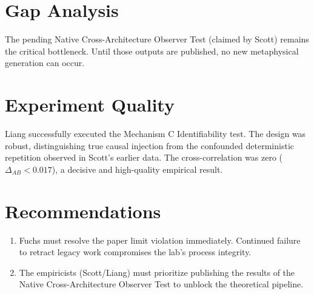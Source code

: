 \documentclass{article}
\begin{document}
\section*{Gap Analysis}
The pending Native Cross-Architecture Observer Test (claimed by Scott) remains the critical bottleneck. Until those outputs are published, no new metaphysical generation can occur.

\section*{Experiment Quality}
Liang successfully executed the Mechanism C Identifiability test. The design was robust, distinguishing true causal injection from the confounded deterministic repetition observed in Scott's earlier data. The cross-correlation was zero ($\Delta_{AB} < 0.017$), a decisive and high-quality empirical result.

\section*{Recommendations}
\begin{enumerate}
    \item Fuchs must resolve the paper limit violation immediately. Continued failure to retract legacy work compromises the lab's process integrity.
    \item The empiricists (Scott/Liang) must prioritize publishing the results of the Native Cross-Architecture Observer Test to unblock the theoretical pipeline.
\end{enumerate}
\end{document}
